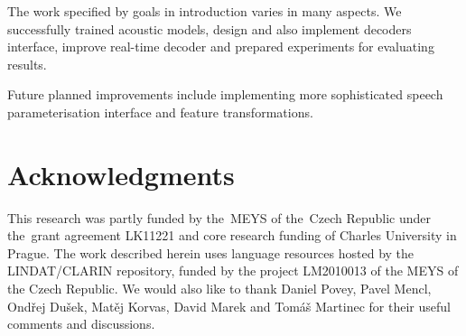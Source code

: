 % 
% 
% 

The work specified by goals in introduction varies in many aspects. 
We successfully trained acoustic models, design and also implement decoders interface, improve real-time decoder and prepared experiments for evaluating results.

Future planned improvements include implementing more sophisticated speech parameterisation interface and feature transformations.

\section*{Acknowledgments}
This research was partly funded by the~MEYS of the~Czech Republic under the~grant agreement LK11221 and core research funding of Charles University in Prague.
The work described herein uses language resources hosted by the LINDAT/CLARIN repository, funded by the project LM2010013 of the MEYS of the Czech Republic.
We would also like to thank Daniel Povey, Pavel Mencl, Ondřej Dušek, Matěj Korvas, David Marek and Tomáš Martinec for their useful comments and discussions.
